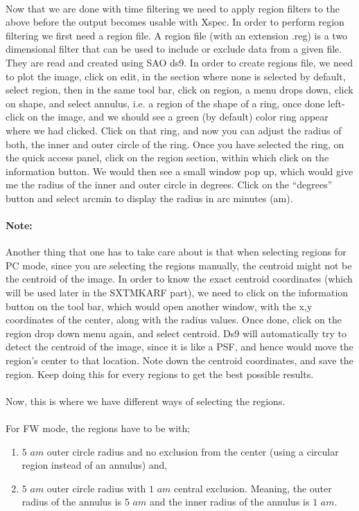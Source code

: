 \documentclass[a4paper,twoside]{report}
\numberwithin{equation}{section}
\begin{document}
\paragraph{}
Now that we are done with time filtering we need to apply region filters to the above before the output becomes usable with Xspec. In order to perform region filtering we first need a region file. A region file (with an extension .reg) is a two dimensional filter that can be used to include or exclude data from a given file. They are read and created using SAO ds9. In order to create regions file, we need to plot the image, click on edit, in the section where none is selected by default, select region, then in the same tool bar, click on region, a menu drops down, click on shape, and select annulus, i.e. a region of the shape of a ring, once done left-click on the image, and we should see a green (by default) color ring appear where we had clicked. Click on that ring, and now you can adjust the radius of both, the inner and outer circle of the ring. Once you have selected the ring, on the quick access panel, click on the region section, within which click on the information button. We would then see a small window pop up, which would give me the radius of the inner and outer circle in degrees. Click on the “degrees” button and select arcmin to display the radius in arc minutes (am). 
\paragraph{Note:}
Another thing that one has to take care about is that when selecting regions for PC mode, since you are selecting the regions manually, the centroid might not be the centroid of the image. In order to know the exact centroid coordinates (which will be used later in the SXTMKARF part), we need to click on the information button on the tool bar, which would open another window, with the x,y coordinates of the center, along with the radius values. Once done, click on the region drop down menu again, and select centroid. Ds9 will automatically try to detect the centroid of the image, since it is like a PSF, and hence would move the region's center to that location. Note down the centroid coordinates, and save the region. Keep doing this for every regions to get the best possible results.
\paragraph{}
Now, this is where we have different ways of selecting the regions. 
\paragraph{}
For FW mode, the regions have to be with;
\begin{enumerate}
\item $5$ $am$ outer circle radius and no exclusion from the center (using a circular region instead of an annulus) and,
\item $5$ $am$ outer circle radius with $1$ $am$ central exclusion. Meaning, the outer radius of the annulus is $5$ $am$ and the inner radius of the annulus is $1$ $am$.
\end{enumerate}
\end{document}
